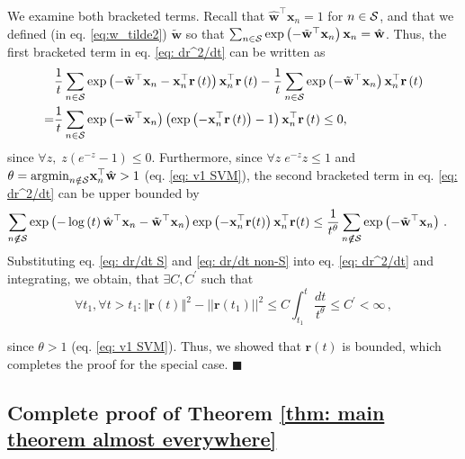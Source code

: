 \documentclass[twoside,11pt,english]{article}
\newcommand{\snote}[1]{{[\color{red}Suriya: #1]}}
\newcommand{\dnote}[1]{{[\color{blue}Daniel: #1]}}
\begin{document}
We examine both bracketed terms.
Recall that $\hat{\mathbf{w}}^{\top}\mathbf{x}_{n}=1$ for $n\in\mathcal{S}$,
and that we defined (in eq. \ref{eq:w_tilde2}) \textbf{$\tilde{\mathbf{w}}$
}so that $\sum_{n\in\mathcal{S}}\exp\left(-\tilde{\mathbf{w}}^{\top}\mathbf{x}_{n}\right)\mathbf{x}_{n}=\hat{\mathbf{w}}$.
Thus, the first bracketed term in eq. \ref{eq: dr^2/dt} can be written
as 
\begin{align}
 & \frac{1}{t}\sum_{n\in\mathcal{S}}\exp\left(-\tilde{\mathbf{w}}^{\top}\mathbf{x}_{n}-\mathbf{x}_{n}^{\top}\mathbf{r}\left(t\right)\right)\mathbf{x}_{n}^{\top}\mathbf{r}\left(t\right)-\frac{1}{t}\sum_{n\in\mathcal{S}}\exp\left(-\tilde{\mathbf{w}}^{\top}\mathbf{x}_{n}\right)\mathbf{x}_{n}^\top\mathbf{r}\left(t\right)\nonumber \\
= & \frac{1}{t}\sum_{n\in\mathcal{S}}\exp\left(-\tilde{\mathbf{w}}^{\top}\mathbf{x}_{n}\right)\left(\exp\left(-\mathbf{x}_{n}^{\top}\mathbf{r}\left(t\right)\right)-1\right)\mathbf{x}_{n}^{\top}\mathbf{r}\left(t\right)\leq0,\label{eq: dr/dt S}
\end{align}
since $\forall z,\;z\left(e^{-z}-1\right)\leq0$. Furthermore, since $\forall z\;e^{-z}z\leq1$
and $\theta=\mathrm{argmin}_{n\notin\mathcal{S}}\mathbf{x}_{n}^{\top}\hat{\mathbf{w}}>1$
(eq. \ref{eq: v1 SVM}), the second bracketed term in eq. \ref{eq: dr^2/dt}
can be upper bounded by 
\begin{align}
\sum_{n\not\notin\mathcal{S}}\exp\left(-\log\left(t\right)\hat{\mathbf{w}}^{\top}\mathbf{x}_{n}-\tilde{\mathbf{w}}^{\top}\mathbf{x}_{n}\right)\exp\left(-\mathbf{x}_{n}^\top \mathbf{r}(t)\right)\mathbf{x}_{n}^\top \mathbf{r}(t) & \leq\frac{1}{t^{\theta}}\sum_{n\not\notin\mathcal{S}}\exp\left(-\tilde{\mathbf{w}}^{\top}\mathbf{x}_{n}\right)\,.\label{eq: dr/dt non-S}
\end{align}
Substituting eq. \ref{eq: dr/dt S} and \ref{eq: dr/dt non-S} into
eq. \ref{eq: dr^2/dt} and integrating, we obtain, that $\exists C,C^{\prime}$
such that %
\[
\forall t_{1},\forall t>t_{1}:\left\Vert \mathbf{r}\left(t\right)\right\Vert ^{2}-||\mathbf{r}(t_{1})||^{2}\leq C\int_{t_{1}}^{t}\frac{dt}{t^{\theta}}\leq C^{\prime}<\infty\,,
\]

since $\theta>1$ (eq. \ref{eq: v1 SVM}). Thus, we showed that $\mathbf{r}(t)$
is bounded, which completes the proof for the special case. $\blacksquare$

\subsection{Complete proof of Theorem \ref{thm: main theorem almost everywhere} \label{sec:Proof-of-Theorem}}
\end{document}
